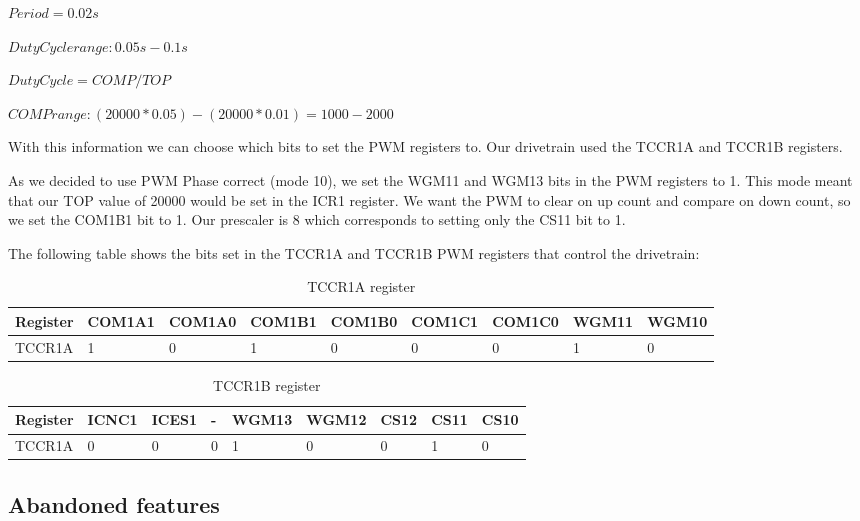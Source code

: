 \documentclass[12pt, a4paper]{article}
\begin{document}
        $Period = 0.02s$
  
        $Duty Cycle range: 0.05s - 0.1s$
  
        $Duty Cycle = COMP/TOP$
  
        $COMP range: (20000*0.05)-(20000*0.01) = 1000-2000$
  
        With this information we can choose which bits to set the PWM registers to. Our drivetrain used the TCCR1A and TCCR1B registers.
  
        As we decided to use PWM Phase correct (mode 10), we set the WGM11 and WGM13 bits in the PWM registers to 1. This mode meant that our TOP value of 20000 would be set in the ICR1 register.
        We want the PWM to clear on up count and compare on down count, so we set the COM1B1 bit to 1.
        Our prescaler is 8 which corresponds to setting only the CS11 bit to 1.
  
        The following table shows the bits set in the TCCR1A and TCCR1B PWM registers that control the drivetrain:
      \begin{table}[h]
        \centering
        \begin{tabular}{l|l|l|l|l|l|l|l|l}
          Register & COM1A1 & COM1A0 & COM1B1 & COM1B0 & COM1C1 & COM1C0 & WGM11 & WGM10 \\ \hline \hline
          TCCR1A & 1 & 0 & 1 & 0 & 0 & 0 & 1 & 0 \\ \hline                        
        \end{tabular}
      \caption{TCCR1A register}
      \label{tab:nome}
      \end{table}
  
      \begin{table}[h]
        \centering
        \begin{tabular}{l|l|l|l|l|l|l|l|l}
          Register & ICNC1 & ICES1 & - & WGM13 & WGM12 & CS12 & CS11 & CS10 \\ \hline \hline
          TCCR1A & 0 & 0 & 0 & 1 & 0 & 0 & 1 & 0 \\ \hline                        
        \end{tabular}
        \caption{TCCR1B register}
        \label{tab:nome}
      \end{table}

      \subsection{Abandoned features}
\end{document}
